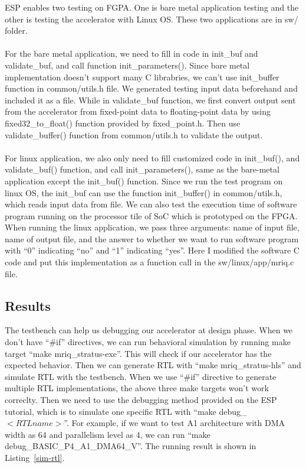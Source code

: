 ESP enables two testing on FGPA. One is bare metal application testing and the
other is testing the accelerator with Linux OS. These two applications are in
sw/ folder. \\ \\ For the bare metal application, we need to fill in code in
init\_buf and validate\_buf, and call function init\_parameters(). Since bare metal
implementation doesn't support many C librabries, we can't use init\_buffer
function in common/utils.h file. We generated testing input data beforehand and
included it as a file. While in validate\_buf function, we first convert output
sent from the accelerator from fixed-point data to floating-point data by using
fixed32\_to\_float() function provided by fixed\_point.h. Then use
validate\_buffer() function from common/utils.h to validate the
output. \\ \\ For linux application, we also only need to fill customized code
in init\_buf(), and validate\_buf() function, and call init\_parameters(), same as the
bare-metal application except the init\_buf() function. Since we run the test
program on linux OS, the init\_buf can use the function init\_buffer() in
common/utils.h, which reads input data from file. We can also test the execution
time of software program running on the processor tile of SoC which is
prototyped on the FPGA. When running the linux application, we pass three
arguments: name of input file, name of output file, and the answer to whether we
want to run software program with ``0'' indicating ``no'' and ``1'' indicating ``yes''. 
Here I modified the software C code and put this implementation as a function call in 
the sw/linux/app/mriq.c file.\\


\subsection{Results}

The testbench can help us debugging our accelerator at design phase. When we
don't have ``\#if'' directives, we can run behavioral simulation by running make
target ``make mriq\_stratus-exe''. This will check if our accelerator has the
expected behavior. Then we can generate RTL with ``make mriq\_stratus-hls'' and
simulate RTL with the testbench. When we use ``\#if'' directive to generate
multiple RTL implementations, the above three make targets won't work
correclty. Then we need to use the debugging method provided on the ESP
tutorial, which is to simulate one specific RTL with ``make debug\_$<RTL name>$''. 
For example, if we want to test A1 architecture with DMA width as 64 and
parallelism level as 4, we can run ``make debug\_BASIC\_P4\_A1\_DMA64\_V''. The
running result is shown in Listing~\ref{sim-rtl}.  \\
\\

